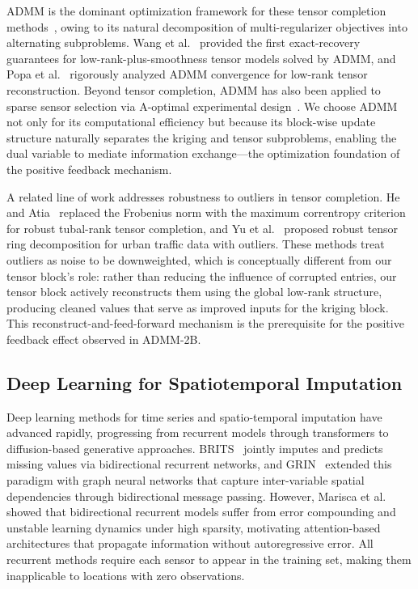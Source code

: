 \documentclass[journal]{IEEEtran}
\begin{document}
ADMM is the dominant optimization framework for these tensor completion methods~\cite{han2025tilr,shu2024lrtc3dst,liu2023tcs}, owing to its natural decomposition of multi-regularizer objectives into alternating subproblems. Wang et al.~\cite{wang2023guaranteed} provided the first exact-recovery guarantees for low-rank-plus-smoothness tensor models solved by ADMM, and Popa et al.~\cite{popa2023admm} rigorously analyzed ADMM convergence for low-rank tensor reconstruction. Beyond tensor completion, ADMM has also been applied to sparse sensor selection via A-optimal experimental design~\cite{nagata2021sparse}. We choose ADMM not only for its computational efficiency but because its block-wise update structure naturally separates the kriging and tensor subproblems, enabling the dual variable to mediate information exchange---the optimization foundation of the positive feedback mechanism.

A related line of work addresses robustness to outliers in tensor completion. He and Atia~\cite{he2023robust} replaced the Frobenius norm with the maximum correntropy criterion for robust tubal-rank tensor completion, and Yu et al.~\cite{yu2025robust} proposed robust tensor ring decomposition for urban traffic data with outliers. These methods treat outliers as noise to be downweighted, which is conceptually different from our tensor block's role: rather than reducing the influence of corrupted entries, our tensor block actively reconstructs them using the global low-rank structure, producing cleaned values that serve as improved inputs for the kriging block. This reconstruct-and-feed-forward mechanism is the prerequisite for the positive feedback effect observed in ADMM-2B.

\subsection{Deep Learning for Spatiotemporal Imputation}

Deep learning methods for time series and spatio-temporal imputation have advanced rapidly, progressing from recurrent models through transformers to diffusion-based generative approaches. BRITS~\cite{cao2018brits} jointly imputes and predicts missing values via bidirectional recurrent networks, and GRIN~\cite{cini2022grin} extended this paradigm with graph neural networks that capture inter-variable spatial dependencies through bidirectional message passing. However, Marisca et al.~\cite{marisca2022learning} showed that bidirectional recurrent models suffer from error compounding and unstable learning dynamics under high sparsity, motivating attention-based architectures that propagate information without autoregressive error. All recurrent methods require each sensor to appear in the training set, making them inapplicable to locations with zero observations.
\end{document}
